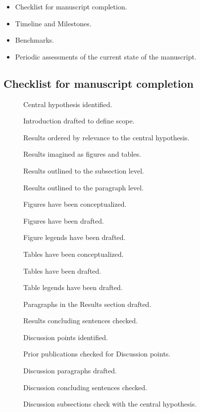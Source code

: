 \documentclass[10pt,letterpaper]{article}
\begin{document}
\begin{itemize}
  \item Checklist for manuscript completion.
  \item Timeline and Milestones.
  \item Benchmarks.
  \item Periodic assessments of the current state of the manuscript.
\end{itemize}

\subsection{Checklist for manuscript completion}








\begin{description}
  \item [\checkmark] Central hypothesis identified.
  \item [] Introduction drafted to define scope.
  \item [] Results ordered by relevance to the central hypothesis.
  \item [] Results imagined as figures and tables.
  \item [] Results outlined to the subsection level.
  \item [] Results outlined to the paragraph level.
  \item [] Figures have been conceptualized.
  \item [] Figures have been drafted.
  \item [] Figure legends have been drafted.
  \item [] Tables have been conceptualized.
  \item [] Tables have been drafted.
  \item [] Table legends have been drafted.
  \item [] Paragraphs in the Results section drafted.
  \item [] Results concluding sentences checked.
  \item [] Discussion points identified.
  \item [] Prior publications checked for Discussion points.
  \item [] Discussion paragraphs drafted.
  \item [] Discussion concluding sentences checked.
  \item [] Discussion subsections check with the central hypothesis.

\end{description}
\end{document}
